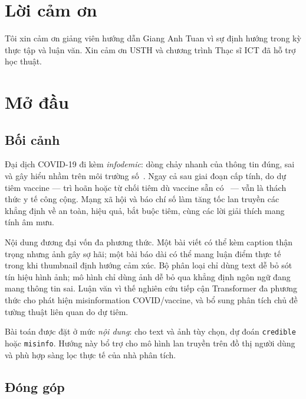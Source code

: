 \documentclass[12pt, a4paper]{report}
\begin{document}
\clearpage

\chapter*{Lời cảm ơn}
Tôi xin cảm ơn giảng viên hướng dẫn Giang Anh Tuan vì sự định hướng trong kỳ thực tập và luận văn.
Xin cảm ơn USTH và chương trình Thạc sĩ ICT đã hỗ trợ học thuật.

\clearpage
\tableofcontents
\clearpage

\setcounter{page}{1}

\chapter{Mở đầu}
\label{chap:introduction}

\section{Bối cảnh}
\label{sec:context}

Đại dịch COVID-19 đi kèm \emph{infodemic}: dòng chảy nhanh của thông tin đúng, sai và gây hiểu nhầm trên môi trường số~\cite{who2020infodemic}.
Ngay cả sau giai đoạn cấp tính, do dự tiêm vaccine --- trì hoãn hoặc từ chối tiêm dù vaccine sẵn có~\cite{macdonald2015hesitancy} --- vẫn là thách thức y tế công cộng.
Mạng xã hội và báo chí số làm tăng tốc lan truyền các khẳng định về an toàn, hiệu quả, bắt buộc tiêm, cùng các lời giải thích mang tính âm mưu.

Nội dung đương đại vốn đa phương thức.
Một bài viết có thể kèm caption thận trọng nhưng ảnh gây sợ hãi; một bài báo dài có thể mang luận điểm thực tế trong khi thumbnail định hướng cảm xúc.
Bộ phân loại chỉ dùng text dễ bỏ sót tín hiệu hình ảnh; mô hình chỉ dùng ảnh dễ bỏ qua khẳng định ngôn ngữ đang mang thông tin sai.
Luận văn vì thế nghiên cứu tiếp cận Transformer đa phương thức cho phát hiện misinformation COVID/vaccine, và bổ sung phân tích chủ đề tường thuật liên quan do dự tiêm.

Bài toán được đặt ở mức \emph{nội dung}: cho text và ảnh tùy chọn, dự đoán \texttt{credible} hoặc \texttt{misinfo}.
Hướng này bổ trợ cho mô hình lan truyền trên đồ thị người dùng và phù hợp sàng lọc thực tế của nhà phân tích.

\section{Đóng góp}
\label{sec:contribution}
\end{document}
